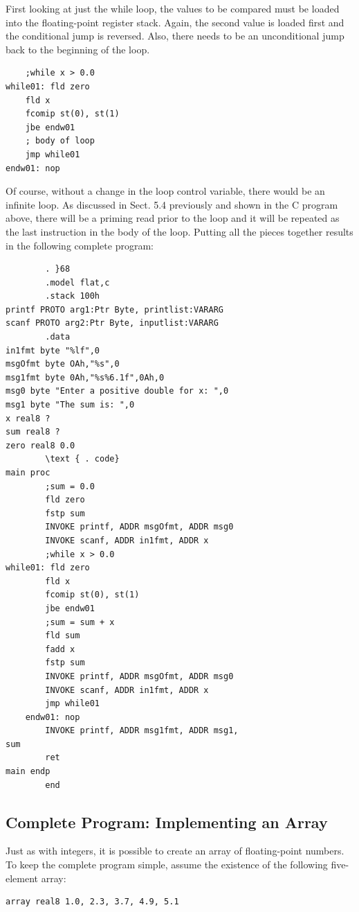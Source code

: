 \documentclass[10pt]{article}
\begin{document}
First looking at just the while loop, the values to be compared must be loaded into the floating-point register stack. Again, the second value is loaded first and the conditional jump is reversed. Also, there needs to be an unconditional jump back to the beginning of the loop.

\begin{verbatim}
    ;while x > 0.0
while01: fld zero
    fld x
    fcomip st(0), st(1)
    jbe endw01
    ; body of loop
    jmp while01
endw01: nop
\end{verbatim}

Of course, without a change in the loop control variable, there would be an infinite loop. As discussed in Sect. 5.4 previously and shown in the C program above, there will be a priming read prior to the loop and it will be repeated as the last instruction in the body of the loop. Putting all the pieces together results in the following complete program:

\begin{verbatim}
        . }68
        .model flat,c
        .stack 100h
printf PROTO arg1:Ptr Byte, printlist:VARARG
scanf PROTO arg2:Ptr Byte, inputlist:VARARG
        .data
in1fmt byte "%lf",0
msgOfmt byte OAh,"%s",0
msg1fmt byte 0Ah,"%s%6.1f",0Ah,0
msg0 byte "Enter a positive double for x: ",0
msg1 byte "The sum is: ",0
x real8 ?
sum real8 ?
zero real8 0.0
        \text { . code}
main proc
        ;sum = 0.0
        fld zero
        fstp sum
        INVOKE printf, ADDR msgOfmt, ADDR msg0
        INVOKE scanf, ADDR in1fmt, ADDR x
        ;while x > 0.0
while01: fld zero
        fld x
        fcomip st(0), st(1)
        jbe endw01
        ;sum = sum + x
        fld sum
        fadd x
        fstp sum
        INVOKE printf, ADDR msgOfmt, ADDR msg0
        INVOKE scanf, ADDR in1fmt, ADDR x
        jmp while01
    endw01: nop
        INVOKE printf, ADDR msg1fmt, ADDR msg1,
sum
        ret
main endp
        end
\end{verbatim}

\subsection*{Complete Program: Implementing an Array}
Just as with integers, it is possible to create an array of floating-point numbers. To keep the complete program simple, assume the existence of the following five-element array:

\begin{verbatim}
array real8 1.0, 2.3, 3.7, 4.9, 5.1
\end{verbatim}
\end{document}
